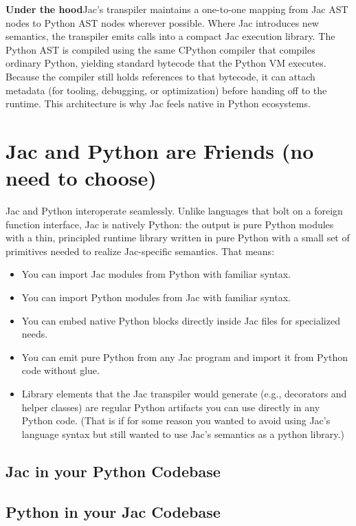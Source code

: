 \begin{nerd}
\textbf{Under the hood}\quad Jac's transpiler maintains a one-to-one mapping from Jac AST nodes to Python AST nodes wherever possible. Where Jac introduces new semantics, the transpiler emits calls into a compact Jac execution library. The Python AST is compiled using the same CPython compiler that compiles ordinary Python, yielding standard bytecode that the Python VM executes. Because the compiler still holds references to that bytecode, it can attach metadata (for tooling, debugging, or optimization) before handing off to the runtime. This architecture is why Jac feels native in Python ecosystems.
\end{nerd}

\section{Jac and Python are Friends (no need to choose)}
Jac and Python interoperate seamlessly. Unlike languages that bolt on a foreign function interface, Jac is natively Python: the output is pure Python modules with a thin, principled runtime library written in pure Python with a small set of primitives needed to realize Jac-specific semantics. That means:

\begin{itemize}
    \item You can import Jac modules from Python with familiar syntax.
    \item You can import Python modules from Jac with familiar syntax.
    \item You can embed native Python blocks directly inside Jac files for specialized needs.
    \item You can emit pure Python from any Jac program and import it from Python code without glue.
    \item Library elements that the Jac transpiler would generate (e.g., decorators and helper classes) are regular Python artifacts you can use directly in any Python code. (That is if for some reason you wanted to avoid using Jac's language syntax but still wanted to use Jac's semantics as a python library.)
\end{itemize}

\subsection{Jac in your Python Codebase}


\subsection{Python in your Jac Codebase}


